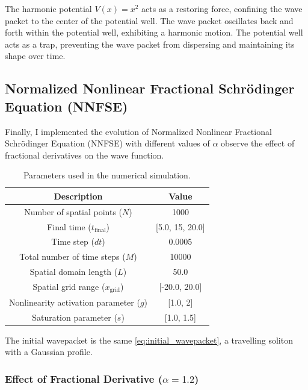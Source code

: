 \documentclass[8pt, a4paper, twocolumn]{article}
\begin{document}
The harmonic potential $V(x) = x^2$ acts as a restoring force, confining the wave packet to the
center of the potential well. The wave packet oscillates back and forth within the potential well,
exhibiting a harmonic motion. The potential well acts as a trap, preventing the wave packet from
dispersing and maintaining its shape over time.

\subsection{Normalized Nonlinear Fractional Schrödinger Equation (NNFSE)}

Finally, I implemented the evolution of Normalized Nonlinear Fractional Schrödinger Equation (NNFSE) with different 
values of $\alpha$ observe the effect of fractional derivatives on the wave function. 
\begin{table}[h!]
	\centering
	\begin{tabular}{c|c}
	\toprule
	\textbf{Description} & \textbf{Value}     \\ 
	\midrule
	Number of spatial points ($N$)              & 1000              \\ 
	Final time ($t_{\text{final}}$)             & [5.0, 15, 20.0]   \\ 
	Time step ($dt$)                            & 0.0005            \\ 
	Total number of time steps ($M$)            & 10000             \\ 
	Spatial domain length ($L$)                 & 50.0              \\ 
	Spatial grid range ($x_{\text{grid}}$)      & [-20.0, 20.0]     \\
	Nonlinearity activation parameter ($g$)     & [1.0, 2]          \\
	Saturation parameter ($s$)                  & [1.0, 1.5]        \\
	\bottomrule
	\end{tabular}
	\caption{Parameters used in the numerical simulation.}
\end{table}

The initial wavepacket is the same \ref{eq:initial_wavepacket}, a travelling 
soliton with a Gaussian profile.

\subsubsection{Effect of Fractional Derivative ($\alpha = 1.2$)}
\end{document}
